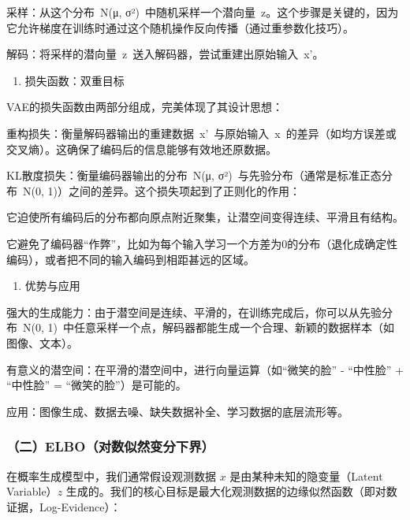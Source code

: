 采样：从这个分布~N(μ, σ²)~中随机采样一个潜向量~z。这个步骤是关键的，因为它允许梯度在训练时通过这个随机操作反向传播（通过重参数化技巧）。

解码：将采样的潜向量~z~送入解码器，尝试重建出原始输入~x'。

\begin{enumerate}
\def\labelenumi{\arabic{enumi}.}
\setcounter{enumi}{2}
\tightlist
\item
  损失函数：双重目标
\end{enumerate}

VAE的损失函数由两部分组成，完美体现了其设计思想：

重构损失：衡量解码器输出的重建数据~x'~与原始输入~x~的差异（如均方误差或交叉熵）。这确保了编码后的信息能够有效地还原数据。

KL散度损失：衡量编码器输出的分布~N(μ, σ²)~与先验分布（通常是标准正态分布~N(0, 1)）之间的差异。这个损失项起到了正则化的作用：

它迫使所有编码后的分布都向原点附近聚集，让潜空间变得连续、平滑且有结构。

它避免了编码器``作弊''，比如为每个输入学习一个方差为0的分布（退化成确定性编码），或者把不同的输入编码到相距甚远的区域。

\begin{enumerate}
\def\labelenumi{\arabic{enumi}.}
\setcounter{enumi}{3}
\tightlist
\item
  优势与应用
\end{enumerate}

强大的生成能力：由于潜空间是连续、平滑的，在训练完成后，你可以从先验分布~N(0, 1)~中任意采样一个点，解码器都能生成一个合理、新颖的数据样本（如图像、文本）。

有意义的潜空间：在平滑的潜空间中，进行向量运算（如``微笑的脸'' - ``中性脸'' + ``中性脸'' = ``微笑的脸''）是可能的。

应用：图像生成、数据去噪、缺失数据补全、学习数据的底层流形等。

\hypertarget{ux4e8celboux5bf9ux6570ux4f3cux7136ux53d8ux5206ux4e0bux754c}{%
\subsubsection{（二）ELBO（对数似然变分下界）}\label{ux4e8celboux5bf9ux6570ux4f3cux7136ux53d8ux5206ux4e0bux754c}}

在概率生成模型中，我们通常假设观测数据 \(x\) 是由某种未知的隐变量（Latent Variable）\(z\) 生成的。我们的核心目标是最大化观测数据的边缘似然函数（即对数证据，Log-Evidence）：

